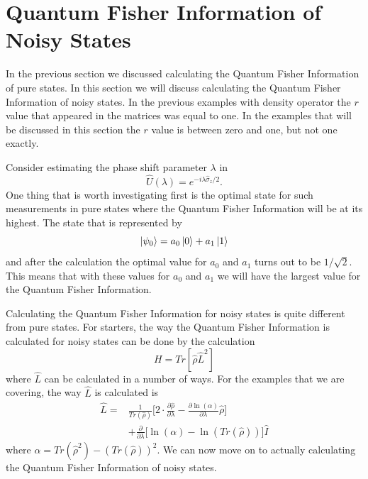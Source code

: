 \documentclass[twocolumn]{article}
\begin{document}
\section*{Quantum Fisher Information of Noisy States}
In the previous section we discussed calculating the Quantum Fisher Information of pure states. In this section we will discuss calculating the Quantum Fisher Information of noisy states. In the previous examples with density operator the $r$ value that appeared in the matrices was equal to one. In the examples that will be discussed in this section the $r$ value is between zero and one, but not one exactly.

Consider estimating the phase shift parameter $\lambda$ in
\begin{equation} \label{eq:71}
\hat{U}(\lambda)=e^{-i\lambda\hat{\sigma}_z/2}.
\end{equation}
One thing that is worth investigating first is the optimal state for such measurements in pure states where the Quantum Fisher Information will be at its highest. The state that is represented by
\begin{equation} \label{eq:72}
\ket{\psi_0}=a_0\ket{0}+a_1\ket{1}
\end{equation}
and after the calculation the optimal value for $a_0$ and $a_1$ turns out to be $1/\sqrt{2}$. This means that with these values for $a_0$ and $a_1$ we will have the largest value for the Quantum Fisher Information.

Calculating the Quantum Fisher Information for noisy states is quite different from pure states. For starters, the way the Quantum Fisher Information is calculated for noisy states can be done by the calculation
\begin{equation} \label{eq:73}
H=Tr[\hat{\rho}\hat{L}^2]
\end{equation}
where $\hat{L}$ can be calculated in a number of ways. For the examples that we are covering, the way $\hat{L}$ is calculated is
\begin{align} \label{eq:74}
\hat{L}=&\frac{1}{Tr(\hat{\rho})}\Big[2\cdot\frac{\partial\hat{\rho}}{\partial\lambda}-\frac{\partial \ln(\alpha)}{\partial\lambda}\hat{\rho}\Big] \nonumber \\
&+\frac{\partial}{\partial\lambda}\Big[\ln(\alpha)-\ln(Tr(\hat{\rho}))\Big]\hat{I}
\end{align}
\cite{D. Collins} where $\alpha=Tr{(\hat{\rho}^2)}-(Tr(\hat{\rho}))^2$. We can now move on to actually calculating the Quantum Fisher Information of noisy states.
\end{document}
